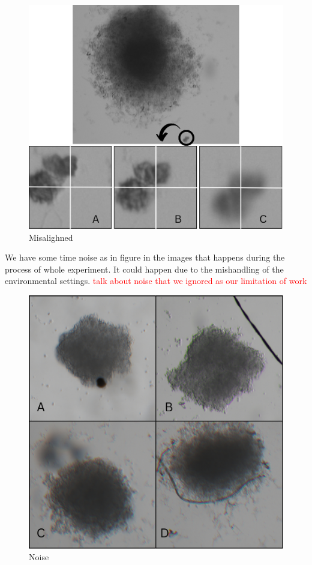  \begin{figure}[H]
  \centering
  \includegraphics[scale=0.4]{figures/posi.png} 
  \caption{Misalighned}
  \label{fig:posi}
\end{figure}

We have some time noise as in figure in the images that happens during the process of whole experiment. It could happen due to the mishandling of the
 environmental settings.
 \textcolor{red}{talk about noise that we ignored as our limitation of work}
  
 \begin{figure}[H]
  \centering
  \includegraphics[scale=0.4]{figures/noise.png} 
  \caption{Noise}
  \label{fig:noise}
\end{figure}
 
